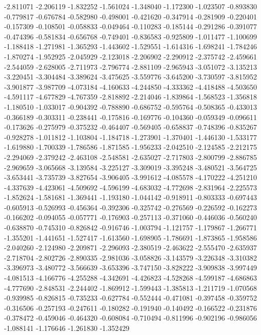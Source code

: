 -2.811071
-2.206119
-1.832252
-1.561024
-1.348040
-1.172300
-1.023507
-0.893830
-0.779817
-0.676784
-0.582980
-0.498001
-0.421620
-0.347914
-0.281909
-0.220401
-0.157309
-0.108501
-0.058833
-0.049464
-0.110283
-0.185144
-0.291286
-0.391077
-0.474396
-0.581834
-0.656768
-0.749401
-0.836583
-0.925809
-1.011477
-1.100699
-1.188418
-1.271981
-1.365293
-1.443602
-1.529551
-1.614316
-1.698241
-1.784246
-1.870274
-1.952925
-2.045929
-2.123018
-2.206902
-2.290912
-2.375742
-2.459661
-2.544059
-2.628005
-2.711973
-2.796774
-2.881109
-2.965943
-3.051072
-3.135213
-3.220451
-3.304484
-3.389624
-3.475625
-3.559776
-3.645200
-3.730597
-3.815952
-3.901877
-3.987709
-4.073184
-4.160633
-4.244850
-4.333362
-4.418488
-4.503650
-4.591117
-4.677829
-4.767359
-2.818892
-2.214046
-1.839864
-1.568523
-1.356818
-1.180510
-1.033017
-0.904392
-0.788890
-0.686752
-0.595764
-0.508365
-0.433013
-0.366189
-0.303311
-0.238441
-0.175816
-0.169776
-0.104360
-0.059349
-0.096611
-0.173626
-0.275979
-0.375232
-0.464407
-0.569405
-0.658837
-0.748396
-0.835267
-0.928278
-1.011812
-1.103804
-1.184718
-1.273901
-1.370401
-1.446130
-1.533177
-1.619880
-1.700339
-1.786586
-1.871585
-1.956233
-2.042510
-2.124585
-2.212175
-2.294069
-2.379242
-2.463108
-2.548581
-2.635027
-2.717803
-2.800799
-2.886785
-2.969659
-3.065668
-3.139584
-3.225127
-3.309019
-3.395248
-3.480521
-3.564725
-3.653441
-3.735739
-3.827654
-3.906405
-3.991612
-4.085578
-4.170222
-4.251210
-4.337639
-4.423061
-4.509692
-4.596199
-4.683032
-4.772698
-2.831964
-2.225573
-1.852624
-1.581681
-1.369441
-1.193180
-1.044142
-0.918911
-0.803333
-0.697443
-0.605913
-0.526993
-0.456364
-0.392306
-0.325742
-0.276569
-0.226592
-0.162273
-0.166202
-0.094055
-0.057771
-0.176903
-0.257113
-0.371060
-0.446036
-0.560240
-0.638870
-0.745310
-0.826842
-0.916746
-1.003794
-1.121757
-1.179867
-1.266771
-1.355201
-1.441651
-1.527417
-1.613560
-1.698905
-1.786691
-1.873865
-1.958586
-2.040260
-2.124980
-2.209871
-2.296093
-2.380519
-2.463622
-2.555470
-2.635937
-2.718704
-2.802726
-2.890335
-2.981036
-3.058826
-3.143579
-3.226348
-3.310382
-3.396973
-3.480772
-3.566639
-3.653396
-3.747150
-3.828222
-3.909838
-3.997449
-4.081513
-4.166776
-4.255288
-4.342691
-4.426823
-4.528268
-4.599187
-4.686863
-4.777690
-2.848531
-2.244402
-1.869912
-1.599443
-1.385813
-1.211719
-1.070568
-0.939985
-0.826815
-0.735233
-0.627784
-0.552444
-0.471081
-0.397458
-0.359752
-0.316506
-0.257193
-0.247611
-0.180282
-0.191940
-0.140492
-0.166522
-0.231876
-0.378472
-0.459046
-0.464320
-0.608084
-0.710494
-0.811996
-0.902196
-0.986056
-1.088141
-1.176646
-1.261830
-1.352429
